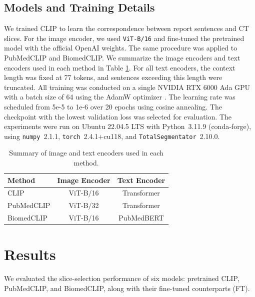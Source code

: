 \documentclass[bioengineering,article,submit,pdftex,moreauthors]{Definitions/mdpi}
\begin{document}
\subsection{Models and Training Details}
We trained CLIP to learn the correspondence between report sentences and CT slices. 
For the image encoder, we used \texttt{ViT-B/16} and fine-tuned the pretrained model with the official OpenAI weights. 
The same procedure was applied to PubMedCLIP and BiomedCLIP. We summarize the image encoders and text encoders used in each method in Table \ref{tab:model_summary}.
For all text encoders, the context length was fixed at 77 tokens, and sentences exceeding this length were truncated.
All training was conducted on a single NVIDIA RTX 6000 Ada GPU with a batch size of 64 using the AdamW optimizer \cite{loshchilov_fixing_2017}. 
The learning rate was scheduled from 5e-5 to 1e-6 over 20 epochs using cosine annealing. 
The checkpoint with the lowest validation loss was selected for evaluation.
The experiments were run on Ubuntu 22.04.5 LTS with Python~3.11.9 (conda-forge), using \texttt{numpy}~2.1.1, \texttt{torch}~2.4.1+cu118, and \texttt{TotalSegmentator}~2.10.0.

\begin{table}[ht]
  \centering
  \caption{Summary of image and text encoders used in each method.}
  \label{tab:model_summary}
  \begin{tabular}{lcc}
    \toprule
    Method                  & Image Encoder      & Text Encoder      \\
    \midrule
    CLIP                    & ViT-B/16          & Transformer       \\
    PubMedCLIP              & ViT-B/32          & Transformer       \\
    BiomedCLIP              & ViT-B/16          & PubMedBERT        \\
    \bottomrule
  \end{tabular}
\end{table}


\section{Results}

We evaluated the slice-selection performance of six models: pretrained CLIP, PubMedCLIP, and BiomedCLIP, along with their fine-tuned counterparts (FT). 
\end{document}
